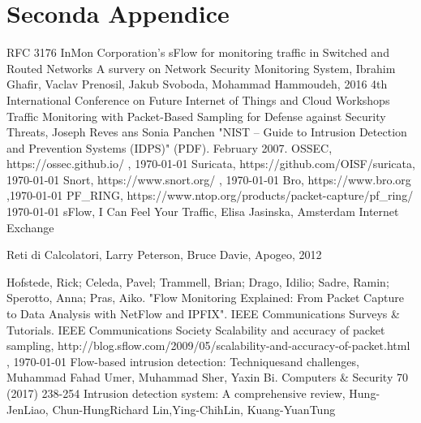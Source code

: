 \documentclass[12pt,a4paper,openright,twoside]{report}
\begin{document}
\chapter{Seconda Appendice}             %
\begin{thebibliography}{90}             %
\rhead[\fancyplain{}{\bfseries \leftmark}]{\fancyplain{}{\bfseries
\thepage}}
 RFC 3176 InMon Corporation's sFlow for monitoring traffic in Switched
and Routed Networks
 A survery on Network Security Monitoring System,
Ibrahim Ghafir, Vaclav Prenosil, Jakub Svoboda, Mohammad Hammoudeh,
 2016 4th International Conference on Future Internet of Things and Cloud Workshops
 Traffic Monitoring with Packet-Based Sampling for Defense against Security Threats, Joseph Reves ans Sonia Panchen
 "NIST – Guide to Intrusion Detection and Prevention Systems (IDPS)" (PDF). February 2007.
 OSSEC, https://ossec.github.io/ , \today
{} Suricata, https://github.com/OISF/suricata, \today
{} Snort, https://www.snort.org/ , \today
{} Bro, https://www.bro.org ,\today
{} PF\_RING, https://www.ntop.org/products/packet-capture/pf\_ring/ \today
{} sFlow, I Can Feel Your Traffic, Elisa Jasinska, Amsterdam Internet Exchange

 Reti di Calcolatori, Larry Peterson, Bruce Davie, Apogeo, 2012

 Hofstede, Rick; Celeda, Pavel; Trammell, Brian; Drago, Idilio; Sadre, Ramin; Sperotto, Anna; Pras, Aiko. "Flow Monitoring Explained: From Packet Capture to Data Analysis with NetFlow and IPFIX". IEEE Communications Surveys & Tutorials. IEEE Communications Society
 Scalability and accuracy of packet sampling, http://blog.sflow.com/2009/05/scalability-and-accuracy-of-packet.html , \today
{} Flow-based intrusion detection: Techniquesand challenges, Muhammad Fahad Umer, Muhammad Sher, Yaxin Bi. Computers \& Security 70 (2017) 238-254
 Intrusion detection system: A comprehensive review, Hung-JenLiao, Chun-HungRichard Lin,Ying-ChihLin, Kuang-YuanTung


\end{thebibliography}
\end{document}
